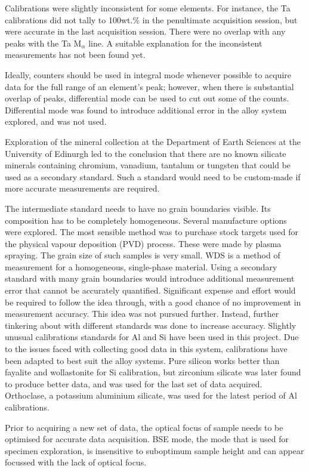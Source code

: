 Calibrations were slightly inconsistent for some elements.  For instance, the Ta  calibrations did not tally to 100wt.\% in the penultimate acquisition session, but were accurate in the last acquisition session.  There were no overlap with any peaks with the Ta M$_{\alpha}$ line.  A suitable explanation for the inconsistent measurements has not been found yet. 

Ideally, counters should be used in integral mode whenever possible to acquire data for the full range of an element's  peak; however, when there is substantial overlap of peaks, differential mode can be used to cut out some of the counts.  Differential mode was found to introduce additional error in the alloy system explored, and was not used. 
  
Exploration of the mineral collection at the Department of Earth Sciences at the University of Edi{n}urgh led to the conclusion that there are no known silicate minerals containing chromium, vanadium, tantalum or tungsten that could be used as a secondary standard.  Such a standard would need to be custom-made if more accurate measurements are required. 

The intermediate standard needs to have no grain boundaries visible.  Its composition has to be completely homogeneous.  Several manufacture options were explored.  The most sensible method was to purchase stock targets used for the physical vapour deposition (PVD) process.  These were made by plasma spraying.  The grain size of such samples is very small.  WDS is a method of measurement for a homogeneous, single-phase material.  Using a secondary standard with many grain boundaries would introduce additional measurement error that cannot be accurately quantified.  Significant expense and effort would be required to follow the idea through, with a good chance of no improvement in measurement accuracy.  This idea was not pursued further.  Instead, further tinkering about with different standards was done to increase accuracy.  Slightly unusual calibrations standards for Al and Si have been used in this project.  Due to the issues faced with collecting good data in this system, calibrations have been adapted to best suit the alloy systems.  Pure silicon works better than fayalite and wollastonite for Si calibration, but zirconium silicate was later found to produce better data, and was used for the last set of data acquired.  Orthoclase, a potassium aluminium silicate, was used for the latest period of Al calibrations.

Prior to acquiring a new set of data, the optical focus of sample needs to be optimised for accurate data acquisition.  BSE mode, the mode that is used for specimen exploration, is insensitive to suboptimum sample height and can appear focussed with the lack of optical focus.

